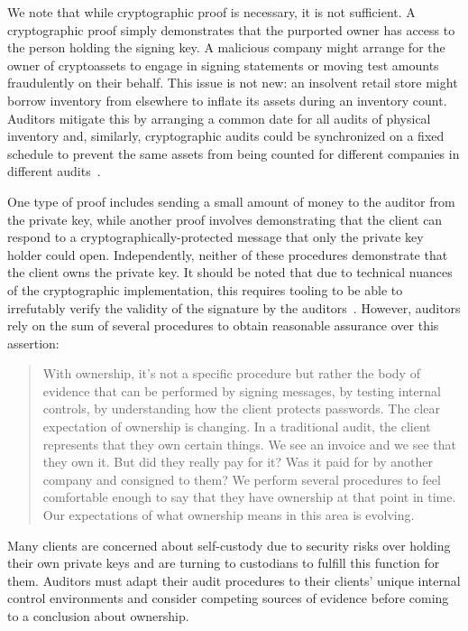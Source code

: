 We note that while cryptographic proof is necessary, it is not sufficient. A cryptographic proof simply demonstrates that the purported owner has access to the person holding the signing key. A malicious company might arrange for the owner of cryptoassets to engage in signing statements or moving test amounts fraudulently on their behalf. This issue is not new: an insolvent retail store might borrow inventory from elsewhere to inflate its assets during an inventory count. Auditors mitigate this by arranging a common date for all audits of physical inventory and, similarly, cryptographic audits could be synchronized on a fixed schedule to prevent the same assets from being counted for different companies in different audits~\cite{dagher2015provisions}. 

One type of proof includes sending a small amount of money to the auditor from the private key, while another proof involves demonstrating that the client can respond to a cryptographically-protected message that only the private key holder could open. Independently, neither of these procedures demonstrate that the client owns the private key. It should be noted that due to technical nuances of the cryptographic implementation, this requires tooling to be able to irrefutably verify the validity of the signature by the auditors~\cite{gavinwrightcourt}. However, auditors rely on the sum of several procedures to obtain reasonable assurance over this assertion: 

\begin{quote}
With ownership, it's not a specific procedure but rather the body of evidence that can be performed by signing messages, by testing internal controls, by understanding how the client protects passwords. The clear expectation of ownership is changing. In a traditional audit, the client represents that they own certain things. We see an invoice and we see that they own it. But did they really pay for it? Was it paid for by another company and consigned to them? We perform several procedures to feel comfortable enough to say that they have ownership at that point in time. Our expectations of what ownership means in this area is evolving.
\end{quote}

Many clients are concerned about self-custody due to security risks over holding their own private keys and are turning to custodians to fulfill this function for them. Auditors must adapt their audit procedures to their clients' unique internal control environments and consider competing sources of evidence before coming to a conclusion about ownership. 

